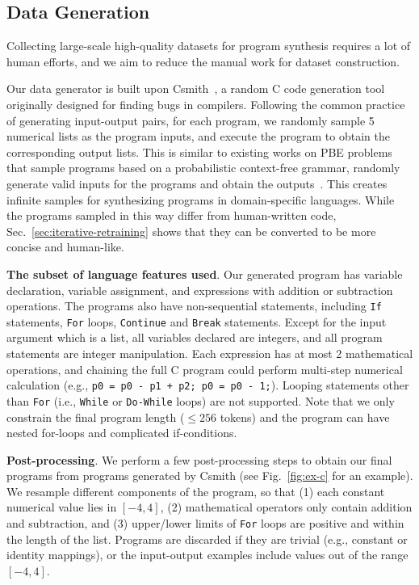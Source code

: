 \subsection{Data Generation}
\vspace{-0.1in}

Collecting large-scale high-quality datasets for program synthesis requires a lot of human efforts, and we aim to reduce the manual work for dataset construction.

Our data generator is built upon Csmith~\cite{yang2011finding}, a random C code generation tool originally designed for finding bugs in compilers. Following the common practice of generating input-output pairs, for each program, we randomly sample 5 numerical lists as the program inputs, and execute the program to obtain the corresponding output lists. This is similar to existing works on PBE problems that sample programs based on a probabilistic context-free grammar, randomly generate valid inputs for the programs and obtain the outputs~\cite{parisotto2016neuro,devlin2017neural,balog2016deepcoder}. This creates infinite samples for synthesizing programs in domain-specific languages. While the programs sampled in this way differ from human-written code, Sec.~\ref{sec:iterative-retraining} shows that they can be converted to be more concise and human-like.

\textbf{The subset of language features used}. Our generated program has variable declaration, variable assignment, and expressions with addition or subtraction operations. The programs also have non-sequential statements, including \texttt{If} statements, \texttt{For} loops, \texttt{Continue} and \texttt{Break} statements. Except for the input argument which is a list, all variables declared are integers, and all program statements are integer manipulation. Each expression has at most 2 mathematical operations, and chaining the full C program could perform multi-step numerical calculation (e.g., \texttt{p0 = p0 - p1 + p2; p0 = p0 - 1;}). Looping statements other than \texttt{For} (i.e., \texttt{While} or \texttt{Do-While} loops) are not supported. Note that we only constrain the final program length ($\le 256$ tokens) and the program can have nested for-loops and complicated if-conditions. 

\textbf{Post-processing}. We perform a few post-processing steps to obtain our final programs from programs generated by Csmith (see Fig.~\ref{fig:ex-c} for an example). We resample different components of the program, so that (1) each constant numerical value lies in $[-4, 4]$, (2) mathematical operators only contain addition and subtraction, and (3) upper/lower limits of \texttt{For} loops are positive and within the length of the list. Programs are discarded if they are trivial (e.g., constant or identity mappings), or the input-output examples include values out of the range $[-4, 4]$.  

